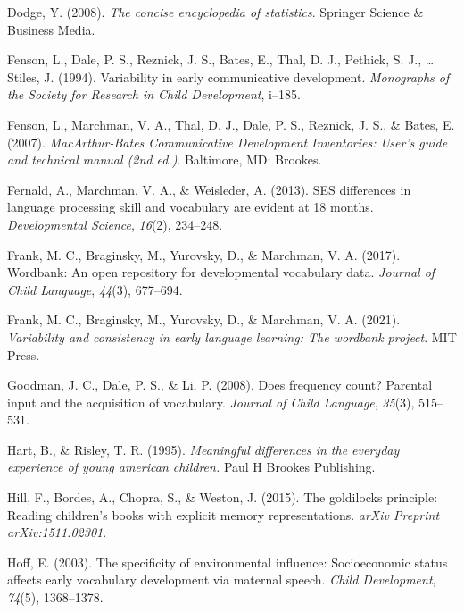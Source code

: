 \documentclass[10pt, letterpaper]{article}
\newenvironment{CSLReferences}%
  {}%
  {\par}
\begin{document}
\begin{CSLReferences}{1}{0}
\leavevmode\hypertarget{ref-dodge2008concise}{}%
Dodge, Y. (2008). \emph{The concise encyclopedia of statistics}.
Springer Science \& Business Media.

\leavevmode\hypertarget{ref-fenson1994variability}{}%
Fenson, L., Dale, P. S., Reznick, J. S., Bates, E., Thal, D. J.,
Pethick, S. J., \ldots{} Stiles, J. (1994). Variability in early
communicative development. \emph{Monographs of the Society for Research
in Child Development}, i--185.

\leavevmode\hypertarget{ref-fenson2007}{}%
Fenson, L., Marchman, V. A., Thal, D. J., Dale, P. S., Reznick, J. S.,
\& Bates, E. (2007). \emph{{M}ac{A}rthur-{B}ates {C}ommunicative
{D}evelopment {I}nventories: User's guide and technical manual (2nd
ed.)}. Baltimore, MD: Brookes.

\leavevmode\hypertarget{ref-fernald2013ses}{}%
Fernald, A., Marchman, V. A., \& Weisleder, A. (2013). SES differences
in language processing skill and vocabulary are evident at 18 months.
\emph{Developmental Science}, \emph{16}(2), 234--248.

\leavevmode\hypertarget{ref-frank2017wordbank}{}%
Frank, M. C., Braginsky, M., Yurovsky, D., \& Marchman, V. A. (2017).
Wordbank: An open repository for developmental vocabulary data.
\emph{Journal of Child Language}, \emph{44}(3), 677--694.

\leavevmode\hypertarget{ref-frank2021}{}%
Frank, M. C., Braginsky, M., Yurovsky, D., \& Marchman, V. A. (2021).
\emph{Variability and consistency in early language learning: The
wordbank project}. MIT Press.

\leavevmode\hypertarget{ref-goodman2008}{}%
Goodman, J. C., Dale, P. S., \& Li, P. (2008). Does frequency count?
Parental input and the acquisition of vocabulary. \emph{Journal of Child
Language}, \emph{35}(3), 515--531.

\leavevmode\hypertarget{ref-hart1995meaningful}{}%
Hart, B., \& Risley, T. R. (1995). \emph{Meaningful differences in the
everyday experience of young american children.} Paul H Brookes
Publishing.

\leavevmode\hypertarget{ref-hill2015goldilocks}{}%
Hill, F., Bordes, A., Chopra, S., \& Weston, J. (2015). The goldilocks
principle: Reading children's books with explicit memory
representations. \emph{arXiv Preprint arXiv:1511.02301}.

\leavevmode\hypertarget{ref-hoff2003specificity}{}%
Hoff, E. (2003). The specificity of environmental influence:
Socioeconomic status affects early vocabulary development via maternal
speech. \emph{Child Development}, \emph{74}(5), 1368--1378.


\end{CSLReferences}
\end{document}
